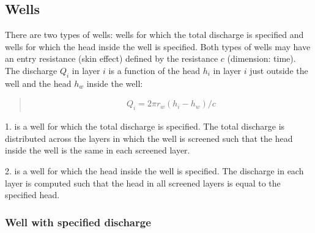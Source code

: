 \documentclass[letterpaper,10pt,english]{sphinxmanual}
\begin{document}
\subsection{Wells}
\label{\detokenize{wells/wellindex:wells}}\label{\detokenize{wells/wellindex::doc}}
There are two types of wells: wells for which the total discharge is specified and wells for which the head inside the well is specified.
Both types of wells may have an entry resistance (skin effect) defined by the resistance \(c\) (dimension: time). The discharge \(Q_i\) in layer \(i\) is a function of the head
\(h_i\) in layer \(i\) just outside the well and the head \(h_w\) inside the well:
\begin{quote}
\begin{equation*}
\begin{split}Q_i = 2\pi r_w(h_i - h_w)/c\end{split}
\end{equation*}\end{quote}

1. {\hyperref[\detokenize{wells/well:timml.well.Well}]{}} is a well for which the total discharge is specified. The total discharge is distributed across the layers in which the
well is screened such that the head inside the well is the same in each screened layer.

2. {\hyperref[\detokenize{wells/headwell:timml.well.HeadWell}]{}} is a well for which the head inside the well is specified. The discharge in each layer is computed such that
the head in all screened layers is equal to the specified head.


\subsubsection{Well with specified discharge}
\label{\detokenize{wells/well:well-with-specified-discharge}}\label{\detokenize{wells/well::doc}}
\end{document}
